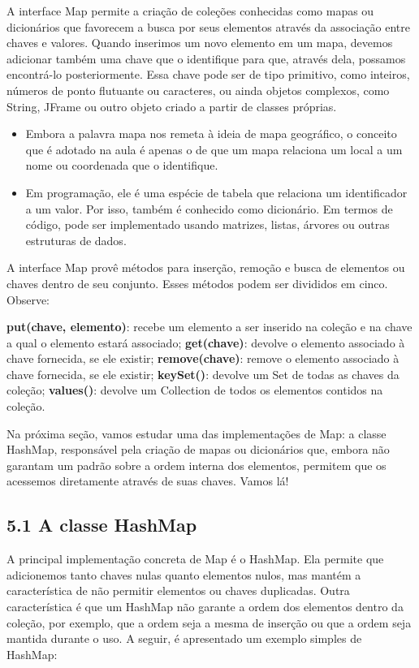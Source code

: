 \documentclass[11pt]{article}
\begin{document}
A interface Map permite a criação de coleções conhecidas como mapas ou dicionários que favorecem a busca por seus elementos através da associação entre chaves e valores. Quando inserimos um novo elemento em um mapa, devemos adicionar também uma chave que o identifique para que, através dela, possamos encontrá-lo posteriormente. Essa chave pode ser de tipo primitivo, como inteiros, números de ponto flutuante ou caracteres, ou ainda objetos complexos, como String, JFrame ou outro objeto criado a partir de classes próprias.

\begin{itemize}
\item Embora a palavra mapa nos remeta à ideia de mapa geográfico, o conceito que é adotado na aula é apenas o de que um mapa relaciona um local a um nome ou coordenada que o identifique.
\item Em programação, ele é uma espécie de tabela que relaciona um identificador a um valor. Por isso, também é conhecido como dicionário. Em termos de código, pode ser implementado usando matrizes, listas, árvores ou outras estruturas de dados.
\end{itemize}

A interface Map provê métodos para inserção, remoção e busca de elementos ou chaves dentro de seu conjunto. Esses métodos podem ser divididos em cinco. Observe:

\textbf{put(chave, elemento)}: recebe um elemento a ser inserido na coleção e na chave a qual o elemento estará associado;
\textbf{get(chave)}: devolve o elemento associado à chave fornecida, se ele existir;
\textbf{remove(chave)}: remove o elemento associado à chave fornecida, se ele existir;
\textbf{keySet()}: devolve um Set de todas as chaves da coleção;
\textbf{values()}: devolve um Collection de todos os elementos contidos na coleção.

Na próxima seção, vamos estudar uma das implementações de Map: a classe HashMap, responsável pela criação de mapas ou dicionários que, embora não garantam um padrão sobre a ordem interna dos elementos, permitem que os acessemos diretamente através de suas chaves. Vamos lá!

\subsection{5.1 A classe HashMap}
\label{sec:orgce15961}
A principal implementação concreta de Map é o HashMap. Ela permite que adicionemos tanto chaves nulas quanto elementos nulos, mas mantém a característica de não permitir elementos ou chaves duplicadas. Outra característica é que um HashMap não garante a ordem dos elementos dentro da coleção, por exemplo, que a ordem seja a mesma de inserção ou que a ordem seja mantida durante o uso. A seguir, é apresentado um exemplo simples de HashMap:
\end{document}
